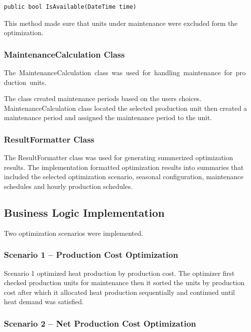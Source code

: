 \begin{verbatim}
public bool IsAvailable(DateTime time)
\end{verbatim}
This method made sure that units under maintenance were excluded form the optimization.

\subsubsection{MaintenanceCalculation Class}

\hbox{The MaintenanceCalculation class was used for handling maintenance for production units.}

The class created maintenance periods based on the users choices.
MaintenanceCalculation class located the selected production unit then created a maintenance period and assigned the maintenance period to the unit.


\subsubsection{ResultFormatter Class}

The ResultFormatter class was used for generating summerized optimization results.
The implementation formatted optimization results into summaries that included the selected optimization scenario, seasonal configuration, maintenance schedules and hourly production schedules.


\subsection{Business Logic Implementation}

Two optimization scenarios were implemented.

\subsubsection{Scenario 1 -- Production Cost Optimization}

Scenario 1 optimized heat production by production cost.
The optimizer first checked production units for maintenance then it sorted the units by production cost after which it allocated heat production sequentially and continued until heat demand was satisfied.

\subsubsection{Scenario 2 -- Net Production Cost Optimization}

